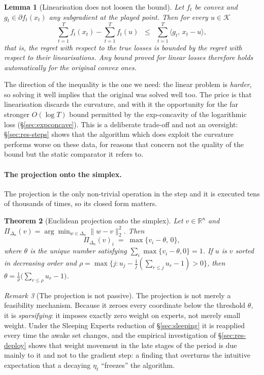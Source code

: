 \documentclass[12pt,a4paper,oneside]{report}
\renewcommand{\_}{\oldunderscore\allowbreak}
\theoremstyle{definition}
\theoremstyle{plain}
\newtheorem{theorem}{Theorem}[chapter]
\newtheorem{lemma}[theorem]{Lemma}
\theoremstyle{remark}
\newtheorem{remark}[theorem]{Remark}
\begin{document}
\begin{lemma}[Linearisation does not loosen the bound]
\label{lem:linearization}
Let $f_t$ be convex and $g_t \in \partial f_t(x_t)$ any subgradient at the played point. Then
for every $u \in \mathcal{K}$
\[
\sum_{t=1}^{T} f_t(x_t) - \sum_{t=1}^{T} f_t(u) \;\;\leq\;\; \sum_{t=1}^{T} \langle g_t,\, x_t - u\rangle,
\]
that is, the regret with respect to the true losses is bounded by the regret with respect to
their linearisations. Any bound proved for linear losses therefore holds automatically for the
original convex ones.
\end{lemma}

The direction of the inequality is the one we need: the linear problem is \emph{harder}, so
solving it well implies that the original was solved well too. The price is that linearisation
discards the curvature, and with it the opportunity for the far stronger $O(\log T)$ bound
permitted by the exp-concavity of the logarithmic loss (\S\ref{sec:expconcave}). This is a
deliberate trade-off and not an oversight: \S\ref{sec:res-steps} shows that the algorithm which
does exploit the curvature performs worse on these data, for reasons that concern not the
quality of the bound but the static comparator it refers to.

\paragraph{The projection onto the simplex.} The projection is the only non-trivial operation
in the step and it is executed tens of thousands of times, so its closed form matters.

\begin{theorem}[Euclidean projection onto the simplex]
\label{thm:projection}
Let $v \in \mathbb{R}^n$ and $\Pi_{\Delta_n}(v) = \arg\min_{w\in\Delta_n}\|w-v\|_2^2$. Then
\[
\Pi_{\Delta_n}(v)_i \;=\; \max\{v_i - \theta,\, 0\},
\]
where $\theta$ is the unique number satisfying $\sum_i \max\{v_i-\theta,0\} = 1$. If $u$ is $v$
sorted in decreasing order and
$\rho = \max\{j : u_j - \frac{1}{j}(\sum_{r\leq j} u_r - 1) > 0\}$, then
$\theta = \frac{1}{\rho}\big(\sum_{r\leq\rho} u_r - 1\big)$.
\end{theorem}

\begin{remark}[The projection is not passive]
The projection is not merely a feasibility mechanism. Because it zeroes every coordinate below
the threshold $\theta$, it is \emph{sparsifying}: it imposes exactly zero weight on experts,
not merely small weight. Under the Sleeping Experts reduction of \S\ref{sec:sleeping} it is
reapplied every time the awake set changes, and the empirical investigation of
\S\ref{sec:res-deploy} shows that weight movement in the late stages of the period is due
mainly to it and not to the gradient step: a finding that overturns the intuitive expectation
that a decaying $\eta_t$ ``freezes'' the algorithm.
\end{remark}
\end{document}
